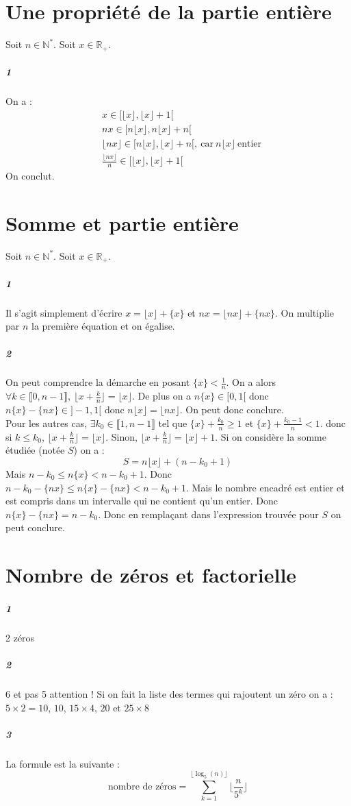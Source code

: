 \documentclass[10pt,a4paper]{article}
\begin{document}
\section{Une propriété de la partie entière}
Soit $n \in \mathbb{N}^*$. Soit $x \in \mathbb{R}_+$.
\subparagraph{1}On a :
\begin{equation}
\begin{aligned}
&x\in [\lfloor x \rfloor,\lfloor x \rfloor+1[\\
&nx \in [n\lfloor x \rfloor,n\lfloor x \rfloor+n[\\
&\lfloor nx \rfloor \in [n\lfloor x \rfloor,\lfloor x \rfloor+n[, \ \text{car} \ n\lfloor x \rfloor \ \text{entier}\\
&\frac{\lfloor nx \rfloor}{n} \in [\lfloor x \rfloor, \lfloor x \rfloor +1[
\end{aligned}
\end{equation}
On conclut.

\section{Somme et partie entière}
Soit $n \in \mathbb{N}^*$. Soit $x \in \mathbb{R}_+$.
\subparagraph{1}Il s'agit simplement d'écrire $x= \lfloor x \rfloor + \lbrace x \rbrace$ et $nx= \lfloor nx \rfloor + \lbrace nx \rbrace$. On multiplie par $n$ la première équation et on égalise.
\subparagraph{2}On peut comprendre la démarche en posant $\lbrace x \rbrace < \frac{1}{n}$. On a alors $\forall k \in \llbracket 0, n-1 \rrbracket, \ \lfloor x+\frac{k}{n} \rfloor= \lfloor x \rfloor$. De plus on a $n\lbrace x \rbrace \in [0,1[$ donc $n \lbrace x \rbrace - \lbrace nx \rbrace \in ]-1,1[$ donc $n\lfloor x \rfloor = \lfloor nx \rfloor$. On peut donc conclure.\\
Pour les autres cas, $\exists k_0 \in \llbracket 1, n-1 \rrbracket$ tel que $\lbrace x \rbrace + \frac{k_0}{n}\ge1$ et $\lbrace x \rbrace+\frac{k_0-1}{n}<1$. donc si $k \le k_0$, $\lfloor x +\frac{k}{n} \rfloor=\lfloor x \rfloor$. Sinon, $\lfloor x +\frac{k}{n} \rfloor=\lfloor x \rfloor+1$. Si on considère la somme étudiée (notée $S$) on a :
\begin{equation}
S=n \lfloor x \rfloor +(n-k_0+1)
\end{equation}
Mais $ n-k_0\le n \lbrace x \rbrace < n- k_0+1$. Donc $n-k_0 - \lbrace nx \rbrace \le n \lbrace x \rbrace - \lbrace nx \rbrace <n-k_0+1$. Mais le nombre encadré est entier et est compris dans un intervalle qui ne contient qu'un entier. Donc $n \lbrace x \rbrace - \lbrace nx \rbrace= n-k_0$. Donc en remplaçant dans l'expression trouvée pour $S$ on peut conclure.
\section{Nombre de zéros et factorielle}
\subparagraph{1}2 zéros
\subparagraph{2}6 et pas 5 attention ! Si on fait la liste des termes qui rajoutent un zéro on a : $5 \times 2=10$, $10$, $15 \times 4$, $20$ et $25 \times 8$
\subparagraph{3}La formule est la suivante :
\begin{equation}
\text{nombre de zéros}=\underset{k=1}{\overset{\lfloor \log_5(n) \rfloor}{\sum}} \lfloor \frac{n}{5^k} \rfloor
\end{equation}
\end{document}
